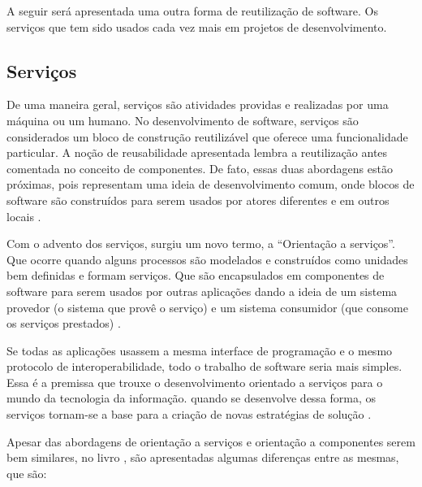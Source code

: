 A seguir será apresentada uma outra forma de reutilização de software. Os serviços que tem sido usados cada vez mais em projetos de desenvolvimento.

\subsection{Serviços}

De uma maneira geral, serviços são atividades providas e realizadas por uma máquina ou um humano. No desenvolvimento de software, serviços são considerados um bloco de construção reutilizável que oferece uma funcionalidade particular. A noção de reusabilidade apresentada lembra a reutilização antes comentada no conceito de componentes. De fato, essas duas abordagens estão próximas, pois representam uma ideia de desenvolvimento comum, onde blocos de software são construídos para serem usados por atores diferentes e em outros locais \cite{Stojanovic:Dahanayake:2005}.

Com o advento dos serviços, surgiu um novo termo, a ``Orientação a serviços''. Que ocorre quando alguns processos são modelados e construídos como unidades bem definidas e formam serviços. Que são encapsulados em componentes de software para serem usados por outras aplicações dando a ideia de um sistema provedor (o sistema que provê o serviço) e um sistema consumidor (que consome os serviços prestados) \cite{Victorino:Brascher:2009}.

Se todas as aplicações usassem a mesma interface de programação e o mesmo protocolo de interoperabilidade, todo o trabalho de software seria mais simples. Essa é a premissa que trouxe o desenvolvimento orientado a serviços para o mundo da tecnologia da informação. quando se desenvolve dessa forma, os serviços tornam-se a base para a criação de novas estratégias de solução \cite{Newcomer:Lomow:2004}.

Apesar das abordagens de orientação a serviços e orientação a componentes serem bem similares, no livro \cite{Stojanovic:Dahanayake:2005}, são apresentadas algumas diferenças entre as mesmas, que são:

